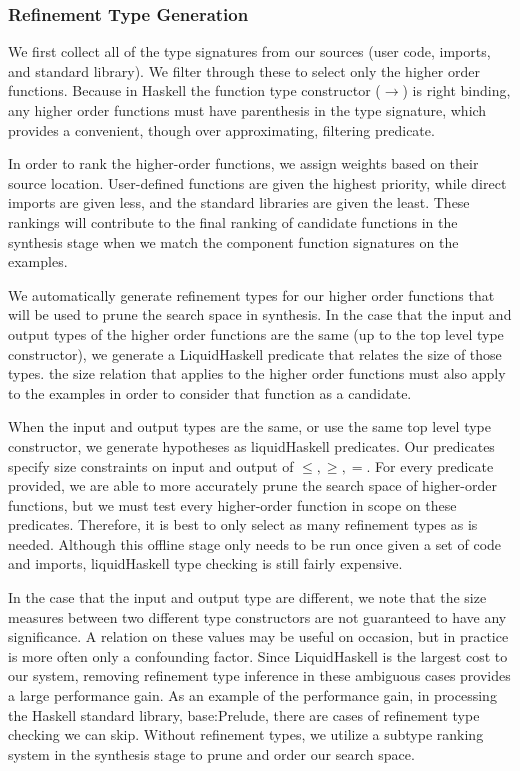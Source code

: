 \subsubsection{Refinement Type Generation}

We first collect all of the type signatures from our sources (user code, imports, and standard library). We filter through these to select only the higher order functions. Because in Haskell the function type constructor ($\to$) is right binding, any higher order functions must have parenthesis in the type signature, which provides a convenient, though over approximating, filtering predicate.

In order to rank the higher-order functions, we assign weights based on their source location. User-defined functions are given the highest priority, while direct imports are given less, and the standard libraries are given the least. These rankings will contribute to the final ranking of candidate functions in the synthesis stage when we match the component function signatures on the examples.

We automatically generate refinement types for our higher order functions that will be used to prune the search space in synthesis.
In the case that the input and output types of the higher order functions are the same (up to the top level type constructor), we generate a LiquidHaskell predicate that relates the size of those types.
the size relation that applies to the higher order functions must also apply to the examples in order to consider that function as a candidate.   

When the input and output types are the same, or use the same top level type constructor, we generate hypotheses as liquidHaskell predicates.
Our predicates specify size constraints on input and output of $\leq,\geq,=$.
For every predicate provided, we are able to more accurately prune the search space of higher-order functions, but we must test every higher-order function in scope on these predicates. 
Therefore, it is best to only select as many refinement types as is needed.
Although this offline stage only needs to be run once given a set of code and imports, liquidHaskell type checking is still fairly expensive.

In the case that the input and output type are different, we note that the size measures between two different type constructors are not guaranteed to have any significance.
A relation on these values may be useful on occasion, but in practice is more often only a confounding factor.
Since LiquidHaskell is the largest cost to our system, removing refinement type inference in these ambiguous cases provides a large performance gain.
As an example of the performance gain, in processing the Haskell standard library, base:Prelude, there are  cases of refinement type checking we can skip.
Without refinement types, we utilize a subtype ranking system in the synthesis stage to prune and order our search space.


